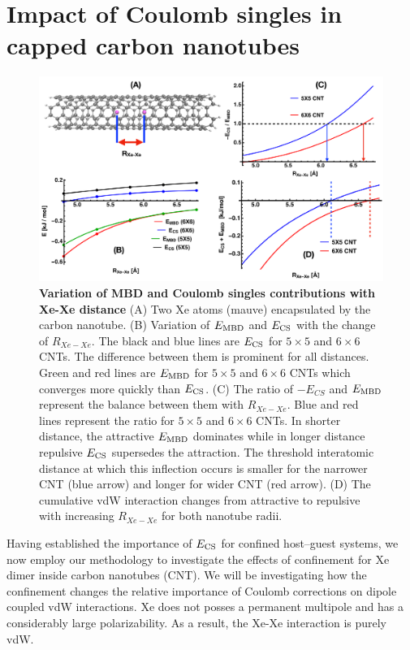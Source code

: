\documentclass[aps,prl,groupaddress, twocolumn]{revtex4-1}  %
\begin{document}
\section*{Impact of Coulomb singles in capped carbon nanotubes}
\begin{figure}[hbtp]
\includegraphics[scale=0.5, width=\textwidth]{Plots/CNTplots.pdf}
\caption{\textbf{Variation of MBD and Coulomb singles contributions with Xe-Xe distance} (A) Two Xe atoms (mauve) encapsulated by the carbon nanotube. (B) Variation of $E_{\rm MBD}$ and $E_{\rm CS}$ with the change of $R_{Xe-Xe}$. The black and blue lines are $E_{\rm CS}$ for $5 \times 5$ and $6 \times 6$ CNTs. The difference between them is prominent for all distances. Green and red lines are $E_{\rm MBD}$ for $5 \times 5$ and $6 \times 6$ CNTs which converges more quickly than $E_{\rm CS}$. (C) The ratio of $-E_{CS}$ and $E_{\rm MBD}$ represent the balance between them with $R_{Xe-Xe}$. Blue and red lines represent the ratio for $5\times5$ and $6\times6$ CNTs. In shorter distance, the attractive $E_{\rm MBD}$ dominates while in longer distance repulsive $E_{\rm CS}$ supersedes the attraction. The threshold interatomic distance at which this inflection occurs is smaller for the narrower CNT (blue arrow) and longer for wider CNT (red arrow). (D) The cumulative vdW interaction changes from attractive to repulsive with increasing $R_{Xe-Xe}$ for both nanotube radii.}\label{fig:CNT}
\end{figure}
Having established the importance of $E_{\rm CS}$ for confined host--guest systems, we now employ our methodology to investigate the effects of confinement for Xe dimer inside carbon nanotubes (CNT). We will be investigating how the confinement changes the relative importance of Coulomb corrections on dipole coupled vdW interactions. Xe does not posses a permanent multipole and has a considerably large polarizability. As a result, the Xe-Xe interaction is purely vdW.
\end{document}
